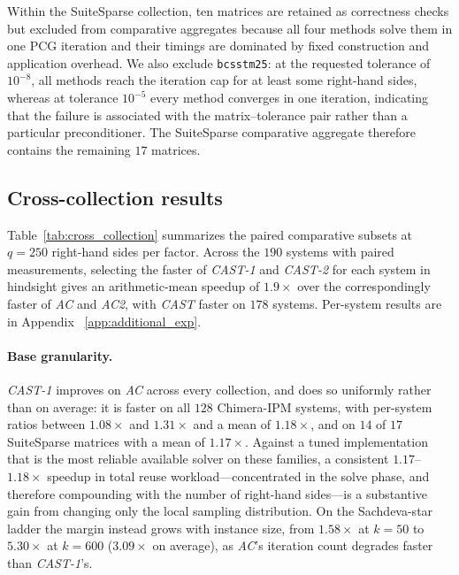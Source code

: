 \documentclass{article}
\newcommand{\CAST}{\textit{CAST}\xspace}
\newcommand{\CASTone}{\textit{CAST-1}\xspace}
\newcommand{\CASTtwo}{\textit{CAST-2}\xspace}
\newcommand{\AC}{\textit{AC}\xspace}
\newcommand{\ACtwo}{\textit{AC2}\xspace}
\newcommand{\1}{\mathbbm{1}}
\theoremstyle{plain}
\begin{document}
Within the Suite\-Sparse collection, ten matrices are retained as
correctness checks but excluded from comparative aggregates because
all four methods solve them in one PCG iteration and their
timings are dominated by fixed construction and application overhead. We also
exclude \texttt{bcsstm25}: at the requested tolerance of $10^{-8}$,
all methods reach the iteration cap for at least some right-hand
sides, whereas at tolerance $10^{-5}$ every method converges in one
iteration, indicating that the failure is associated with the
matrix--tolerance pair rather than a particular pre\-conditioner. The
Suite\-Sparse comparative aggregate therefore contains the remaining
$17$ matrices.




\subsection{Cross-collection results}
\label{sec:cross-collection}



Table~\ref{tab:cross_collection} summarizes the paired comparative
subsets at $q=250$ right-hand sides per factor. Across the $190$
systems with paired measurements, selecting the faster of \CASTone{}
and \CASTtwo{} for each system in hindsight gives an arithmetic-mean
speedup of $1.9\times$ over the correspondingly faster of \AC{} and
\ACtwo{}, with \CAST{} faster on $178$ systems. Per-system results 
 are in Appendix ~\ref{app:additional_exp}.

\paragraph{Base granularity.}
\CASTone{} improves on \AC{} across every collection, and does so
uniformly rather than on average: it is faster on all $128$
Chimera-IPM systems, with per-system ratios between $1.08\times$ and
$1.31\times$ and a mean of $1.18\times$, and on $14$ of $17$
Suite\-Sparse matrices with a mean of $1.17\times$. 
Against a tuned implementation that is the most reliable available solver on these families, a consistent $1.17$--$1.18\times$ speedup
in total reuse workload---concentrated in the solve phase, and
therefore compounding with the number of right-hand sides---is a
substantive gain from changing only the local sampling distribution. On the Sachdeva-star ladder the margin instead grows with instance
size, from $1.58\times$ at $k=50$ to $5.30\times$ at $k=600$
($3.09\times$ on average), as \AC{}'s iteration count degrades faster
than \CASTone{}'s.
\end{document}
